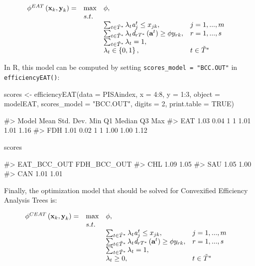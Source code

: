 \begin{equation} \label{(12)} 
\begin{array}{lllll} 
{\phi ^{EAT} \left({\it \textbf{x}}_{k} ,{\it \textbf{y}}_{k} \right)=} & {\max } & {\phi, } & {} & {} \\ 
{} & {s.t.} & {} & {} & {} \\ 
{} & {} & {\sum_{t\in \tilde{T}^{*}} \lambda_{t} {\it a}_{j}^{t}  \le x_{jk} ,} & {j=1,...,m} & {} \\ 
{} & {} & {\sum_{t\in \tilde{T}^{*}} \lambda_{t} {\it d}_{rT^{*}} \left({\it \textbf{a}}^{t} \right) \ge \phi y_{rk} ,} & {r=1,...,s} & {} \\ 
{} & {} & {\sum_{t\in \tilde{T}^{*}}^{}\lambda_{t}  =1,} & {} & {} \\ 
{} & {} & {\lambda _{t} \in \left\{0,1\right\},} & {t\in \tilde{T}^{*} } & {} 
\end{array} 
\end{equation}

In R, this model can be computed by setting
\texttt{scores\_model\ =\ "BCC.OUT"} in \texttt{efficiencyEAT()}:

\begin{Schunk}
\begin{Sinput}
scores <- efficiencyEAT(data = PISAindex, x = 4:8, y = 1:3, object = modelEAT, 
                        scores_model = "BCC.OUT", digits = 2, 
                        print.table = TRUE)
\end{Sinput}
\begin{Soutput}
#>  Model Mean Std. Dev. Min Q1 Median   Q3  Max
#>    EAT 1.03      0.04   1  1   1.01 1.01 1.16
#>    FDH 1.01      0.02   1  1   1.00 1.00 1.12
\end{Soutput}
\begin{Sinput}
scores %>% sample_n(3)
\end{Sinput}
\begin{Soutput}
#>     EAT_BCC_OUT FDH_BCC_OUT
#> CHL        1.09        1.05
#> SAU        1.05        1.00
#> CAN        1.01        1.01
\end{Soutput}
\end{Schunk}

Finally, the optimization model that should be solved for Convexified
Efficiency Analysis Trees is:

\begin{equation} \label{(13)} 
\begin{array}{lllll} 
{\phi ^{CEAT} \left({\it \textbf{x}}_{k} ,{\it \textbf{y}}_{k} \right)=} & {\max } & {\phi, } & {} & {} \\ 
{} & {s.t.} & {} & {} & {} \\ 
{} & {} & {\sum_{t\in \tilde{T}^{*}}^{}\lambda_{t} {\it a}_{j}^{t}  \le x_{jk} ,} & {j=1,...,m} & {} \\ 
{} & {} & {\sum_{t\in \tilde{T}^{*}}^{}\lambda_{t} {\it d}_{rT^{*}} \left({\it \textbf{a}}^{t} \right) \ge \phi y_{rk} ,} & {r=1,...,s} & {} \\ 
{} & {} & {\sum_{t\in \tilde{T}^{*}}^{}\lambda_{t}=1,} & {} & {} \\ 
{} & {} & {\lambda _{t} \ge 0,} & {t\in \tilde{T}^{*}} & {} 
\end{array}
\end{equation}

